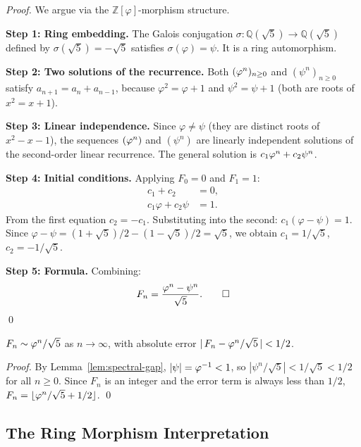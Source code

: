 \begin{proof}
We argue via the \(\mathbb{Z}[\varphi]\)-morphism structure.

\textbf{Step 1: Ring embedding.}
The Galois conjugation \(\sigma : \mathbb{Q}(\sqrt{5}) \to \mathbb{Q}(\sqrt{5})\)
defined by \(\sigma(\sqrt{5}) = -\sqrt{5}\) satisfies \(\sigma(\varphi) = \psi\).
It is a ring automorphism.

\textbf{Step 2: Two solutions of the recurrence.}
Both \((\varphi^{n})_{n\geq 0}\) and \((\psi^n)_{n\geq 0}\) satisfy
\(a_{n+1} = a_n + a_{n-1}\), because \(\varphi^2 = \varphi + 1\) and
\(\psi^2 = \psi + 1\) (both are roots of \(x^2 = x + 1\)).

\textbf{Step 3: Linear independence.}
Since \(\varphi \neq \psi\) (they are distinct roots of \(x^2 - x - 1\)), the
sequences \((\varphi^{n})\) and \((\psi^n)\) are linearly independent solutions
of the second-order linear recurrence.  The general solution is
\(c_1 \varphi^{n} + c_2 \psi^n\).

\textbf{Step 4: Initial conditions.}
Applying \(F_0 = 0\) and \(F_1 = 1\):
\begin{align*}
  c_1 + c_2 &= 0,\\
  c_1\varphi + c_2\psi &= 1.
\end{align*}
From the first equation \(c_2 = -c_1\).  Substituting into the second:
\(c_1(\varphi - \psi) = 1\).  Since
\(\varphi - \psi = (1+\sqrt{5})/2 - (1-\sqrt{5})/2 = \sqrt{5}\),
we obtain \(c_1 = 1/\sqrt{5}\), \(c_2 = -1/\sqrt{5}\).

\textbf{Step 5: Formula.}
Combining:
\[
  F_n = \frac{\varphi^{n} - \psi^n}{\sqrt{5}}. \qquad \square
\]
\qed
\end{proof}

\begin{corollary}\label{cor:asymptotic}
\(F_n \sim \varphi^{n}/\sqrt{5}\) as \(n \to \infty\), with absolute
error \(|\,F_n - \varphi^{n}/\sqrt{5}\,| < 1/2\).
\end{corollary}

\begin{proof}
By Lemma~\ref{lem:spectral-gap}, \(|\psi| = \varphi^{-1} < 1\), so
\(|\psi^n/\sqrt{5}| < 1/\sqrt{5} < 1/2\) for all \(n \geq 0\).
Since \(F_n\) is an integer and the error term is always less than \(1/2\),
\(F_n = \lfloor \varphi^{n}/\sqrt{5} + 1/2 \rfloor\).
\qed
\end{proof}

\subsection{The Ring Morphism Interpretation}\label{subsec:ch7-morphism}

